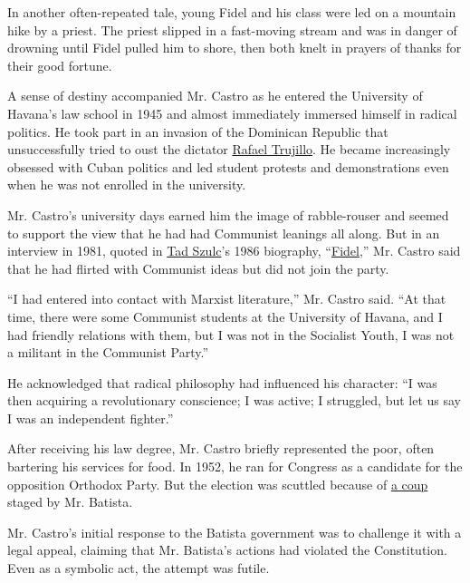In another often-repeated tale, young Fidel and his class were led on a
mountain hike by a priest. The priest slipped in a fast-moving stream
and was in danger of drowning until Fidel pulled him to shore, then both
knelt in prayers of thanks for their good fortune.

A sense of destiny accompanied Mr. Castro as he entered the University
of Havana's law school in 1945 and almost immediately immersed himself
in radical politics. He took part in an invasion of the Dominican
Republic that unsuccessfully tried to oust the dictator
\href{http://www.britannica.com/EBchecked/topic/607139/Rafael-Trujillo}{Rafael
Trujillo}. He became increasingly obsessed with Cuban politics and led
student protests and demonstrations even when he was not enrolled in the
university.

Mr. Castro's university days earned him the image of rabble-rouser and
seemed to support the view that he had had Communist leanings all along.
But in an interview in 1981, quoted in
\href{http://www.nytimes.com/2001/05/22/world/tad-szulc-74-dies-times-correspondent-who-uncovered-bay-of-pigs-imbroglio.html}{Tad
Szulc}'s 1986 biography,
``\href{http://www.nytimes.com/1986/11/30/books/power-unshared-and-total.html}{Fidel},''
Mr. Castro said that he had flirted with Communist ideas but did not
join the party.

``I had entered into contact with Marxist literature,'' Mr. Castro said.
``At that time, there were some Communist students at the University of
Havana, and I had friendly relations with them, but I was not in the
Socialist Youth, I was not a militant in the Communist Party.''

He acknowledged that radical philosophy had influenced his character:
``I was then acquiring a revolutionary conscience; I was active; I
struggled, but let us say I was an independent fighter.''

After receiving his law degree, Mr. Castro briefly represented the poor,
often bartering his services for food. In 1952, he ran for Congress as a
candidate for the opposition Orthodox Party. But the election was
scuttled because of
\href{http://timesmachine.nytimes.com/timesmachine/1952/03/11/84244252.html?pageNumber=1}{a
coup} staged by Mr. Batista.

Mr. Castro's initial response to the Batista government was to challenge
it with a legal appeal, claiming that Mr. Batista's actions had violated
the Constitution. Even as a symbolic act, the attempt was futile.

